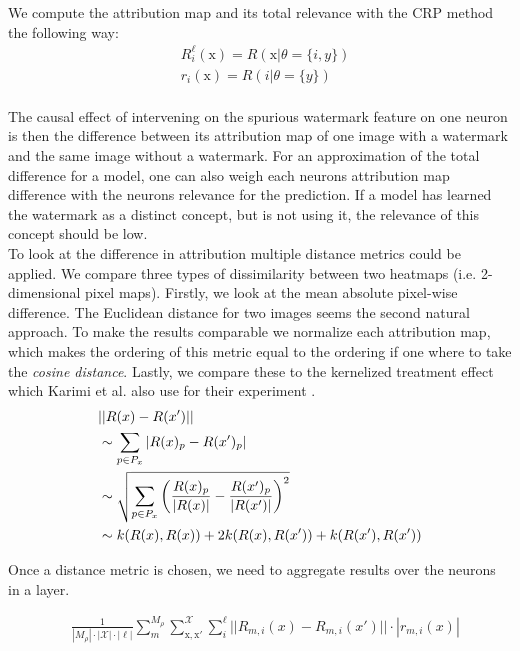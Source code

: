 We compute the attribution map and its total relevance with the CRP method the following way:
\begin{align*}
& R_i^{\ell}(\mathrm{x}) = R(\mathrm{x} | \theta=\{i, y\}) \\
& r_i(\mathrm{x}) = R(i | \theta=\{y\}) \\
\end{align*}

The causal effect of intervening on the spurious watermark feature on one neuron is then the difference between its attribution map of one image with a watermark and the same image without a watermark. For an approximation of the total difference for a model, one can also weigh each neurons attribution map difference with the neurons relevance for the prediction. If a model has learned the watermark as a distinct concept, but is not using it, the relevance of this concept should be low. \\

To look at the difference in attribution multiple distance metrics could be applied. We compare three types of dissimilarity between two heatmaps (i.e. 2-dimensional pixel maps). Firstly, we look at the mean absolute pixel-wise difference. The Euclidean distance for two images seems the second natural approach. To make the results comparable we normalize each attribution map, which makes the ordering of this metric equal to the ordering if one where to take the \textit{cosine distance}.
Lastly, we compare these to the kernelized treatment effect which Karimi et al. also use for their experiment \cite{Karimi2023}. \\ 



\begin{align}
& ||R(x) - R(x')|| \notag \\
& \sim \sum_{p \in P_x} |R(x)_p - R(x')_p| \\
& \sim \sqrt{\sum_{p \in P_x}\left( \frac{R(x)_p}{|R(x)|} - \frac{R(x')_p}{|R(x')|} \right) ^2} \\
& \sim k(R(x) ,R(x) ) + 2 k(R(x) ,R(x') ) + k(R(x') ,R(x') )  
\end{align}

Once a distance metric is chosen, we need to aggregate results over the neurons in a layer.

\begin{align}
& \frac{1}{|M_\rho|\cdot |\mathcal{X}| \cdot |\ell| }\sum_{m}^{M_{\rho}} \sum_{\mathrm{x,x'}}^{\mathcal{X}} \sum_{i}^{\ell} || R_{m,i}(x) - R_{m,i}(x') || \cdot |r_{m,i}(x) |
\end{align}

